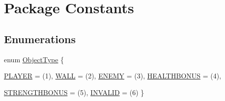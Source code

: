 \hypertarget{namespace_constants}{
\section{Package Constants}
\label{namespace_constants}
}
\subsection*{Enumerations}
\begin{DoxyCompactItemize}
\item 
enum \hyperlink{namespace_constants_a8e6b5222af8b63ce1ca720f448d217ca}{ObjectType} \{ \par
\hyperlink{namespace_constants_a8e6b5222af8b63ce1ca720f448d217ca}{PLAYER} = (1), 
\hyperlink{namespace_constants_a8e6b5222af8b63ce1ca720f448d217ca}{WALL} = (2), 
\hyperlink{namespace_constants_a8e6b5222af8b63ce1ca720f448d217ca}{ENEMY} = (3), 
\hyperlink{namespace_constants_a8e6b5222af8b63ce1ca720f448d217ca}{HEALTHBONUS} = (4), 
\par
\hyperlink{namespace_constants_a8e6b5222af8b63ce1ca720f448d217ca}{STRENGTHBONUS} = (5), 
\hyperlink{namespace_constants_a8e6b5222af8b63ce1ca720f448d217ca}{INVALID} = (6)
 \}
\end{DoxyCompactItemize}



